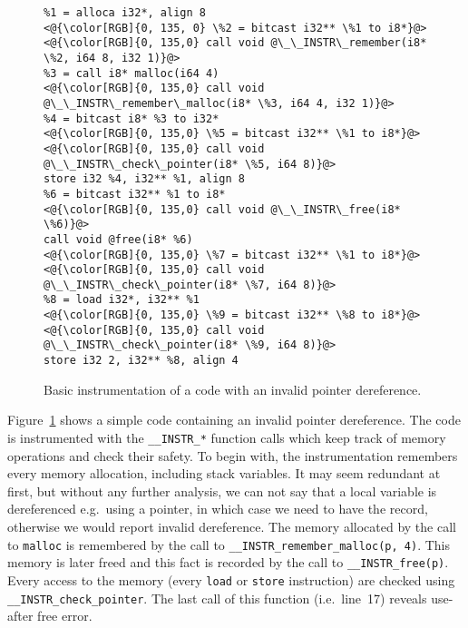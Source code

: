 \begin{figure}[t]
\begin{lstlisting}
%1 = alloca i32*, align 8
<@{\color[RGB]{0, 135, 0} \%2 = bitcast i32** \%1 to i8*}@>
<@{\color[RGB]{0, 135,0} call void @\_\_INSTR\_remember(i8* \%2, i64 8, i32 1)}@>
%3 = call i8* malloc(i64 4)
<@{\color[RGB]{0, 135,0} call void @\_\_INSTR\_remember\_malloc(i8* \%3, i64 4, i32 1)}@>
%4 = bitcast i8* %3 to i32*
<@{\color[RGB]{0, 135,0} \%5 = bitcast i32** \%1 to i8*}@>
<@{\color[RGB]{0, 135,0} call void @\_\_INSTR\_check\_pointer(i8* \%5, i64 8)}@>
store i32 %4, i32** %1, align 8
%6 = bitcast i32** %1 to i8*
<@{\color[RGB]{0, 135,0} call void @\_\_INSTR\_free(i8* \%6)}@>
call void @free(i8* %6)
<@{\color[RGB]{0, 135,0} \%7 = bitcast i32** \%1 to i8*}@>
<@{\color[RGB]{0, 135,0} call void @\_\_INSTR\_check\_pointer(i8* \%7, i64 8)}@>
%8 = load i32*, i32** %1
<@{\color[RGB]{0, 135,0} \%9 = bitcast i32** \%8 to i8*}@>
<@{\color[RGB]{0, 135,0} call void @\_\_INSTR\_check\_pointer(i8* \%9, i64 8)}@>
store i32 2, i32** %8, align 4
\end{lstlisting}
\caption{Basic instrumentation of a code with an invalid pointer
  dereference.}
\label{fig:example1}
\end{figure}

Figure~\ref{fig:example1} shows a simple code containing an invalid
pointer dereference. The code is instrumented with the
\texttt{\_\_INSTR\_*} function calls which keep track of memory
operations and check their safety. To begin with, the instrumentation
remembers every memory allocation, including stack variables. It may
seem redundant at first, but without any further analysis, we can not
say that a local variable is dereferenced e.g.~using a pointer, in
which case we need to have the record, otherwise we would report
invalid dereference.
The memory allocated by the call to \texttt{malloc} is remembered by the call
to \texttt{\_\_INSTR\_remember\_malloc(p, 4)}. This memory is later freed and
this fact is recorded by the call to \texttt{\_\_INSTR\_free(p)}. Every access to the memory (every \texttt{load} or \texttt{store} instruction)
are checked using \texttt{\_\_INSTR\_check\_pointer}. The last call of this
function (i.e.~line~17) reveals
use-after free error. 


